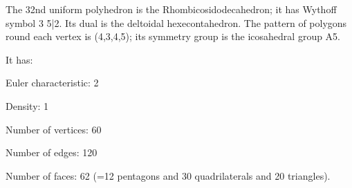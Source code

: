 The 32nd uniform polyhedron is the Rhombicosidodecahedron; it has Wythoff symbol 3 5|2. Its dual is the deltoidal hexecontahedron. The pattern of polygons round each vertex is (4,3,4,5); its symmetry group is the icosahedral group A5.\par
It has:\par
Euler characteristic: 2\par
Density: 1\par
Number of vertices: 60\par
Number of edges:  120\par
Number of faces: 62 (=12 pentagons and 30 quadrilaterals and 20 triangles).